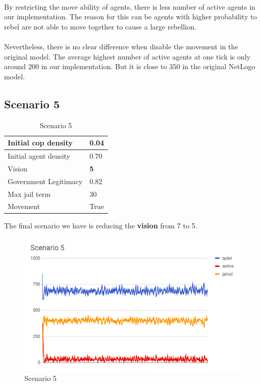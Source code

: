 \documentclass[11pt]{article}
\begin{document}
      \paragraph{}
      By restricting the move ability of agents, there is less number of active
      agents in our implementation. The reason for this can be agents with higher
      probability to rebel are not able to move together to cause a large rebellion.
      \paragraph{}
      Nevertheless, there is no clear difference when disable the movement in the
      original model. The average highest number of active agents at
      one tick is only around $200$ in our implementation. But it is close to $350$
      in the original NetLogo model. 

      \subsection{Scenario 5}
      \begin{table}[ht]
        \begin{center}
          \begin{tabular}{|l|l|}
          \hline
            Initial cop density & 0.04 \\
          \hline
            Initial agent density & 0.70 \\
          \hline
            Vision & \textbf{5} \\
          \hline
            Government Legitimacy & 0.82 \\
          \hline
            Max jail term & 30 \\
          \hline
            Movement & True \\
          \hline
          \end{tabular}
          \caption{Scenario 5}\label{table5}
        \end{center}
      \end{table}
      The final scenario we have is reducing the \textbf{vision} from 7 to 5.
      \begin{figure}[h!]
        \includegraphics[width=\linewidth]{Scenario_5.png}
        \caption{Scenario 5}
        \label{fig:scenario}
      \end{figure}
\end{document}
